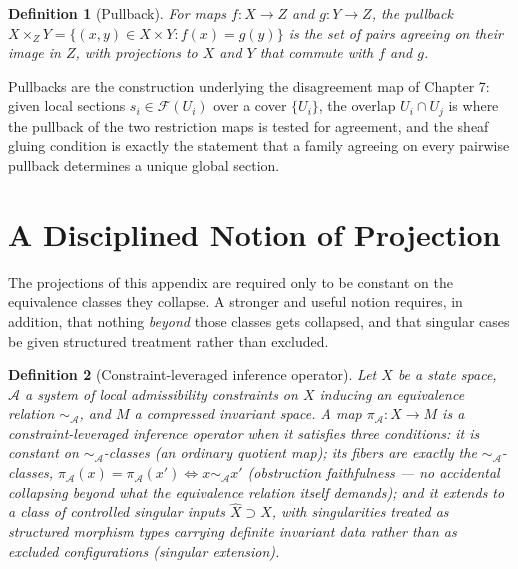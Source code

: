 \documentclass[12pt]{report}
\newtheorem{definition}{Definition}[section]
\begin{document}
\begin{definition}[Pullback]
For maps $f : X \to Z$ and $g : Y \to Z$, the pullback $X \times_Z Y =
\{(x,y) \in X \times Y : f(x) = g(y)\}$ is the set of pairs agreeing on
their image in $Z$, with projections to $X$ and $Y$ that commute with
$f$ and $g$.
\end{definition}

Pullbacks are the construction underlying the disagreement map of
Chapter 7: given local sections $s_i \in \mathcal{F}(U_i)$ over a cover
$\{U_i\}$, the overlap $U_i \cap U_j$ is where the pullback of the two
restriction maps is tested for agreement, and the sheaf gluing condition
is exactly the statement that a family agreeing on every pairwise
pullback determines a unique global section.

\section*{A Disciplined Notion of Projection}

The projections of this appendix are required only to be constant on
the equivalence classes they collapse. A stronger and useful notion
requires, in addition, that nothing \emph{beyond} those classes gets
collapsed, and that singular cases be given structured treatment rather
than excluded.

\begin{definition}[Constraint-leveraged inference operator]
\label{def:CLIO-appB}
Let $X$ be a state space, $\mathcal{A}$ a system of local admissibility
constraints on $X$ inducing an equivalence relation $\sim_\mathcal{A}$,
and $M$ a compressed invariant space. A map $\pi_\mathcal{A} : X \to M$
is a constraint-leveraged inference operator when it satisfies three
conditions: it is constant on $\sim_\mathcal{A}$-classes (an ordinary
quotient map); its fibers are \emph{exactly} the $\sim_\mathcal{A}$-classes,
$\pi_\mathcal{A}(x) = \pi_\mathcal{A}(x') \iff x \sim_\mathcal{A} x'$
(obstruction faithfulness --- no accidental collapsing beyond what the
equivalence relation itself demands); and it extends to a class of
controlled singular inputs $\hat{X} \supset X$, with singularities
treated as structured morphism types carrying definite invariant data
rather than as excluded configurations (singular extension).
\end{definition}
\end{document}
